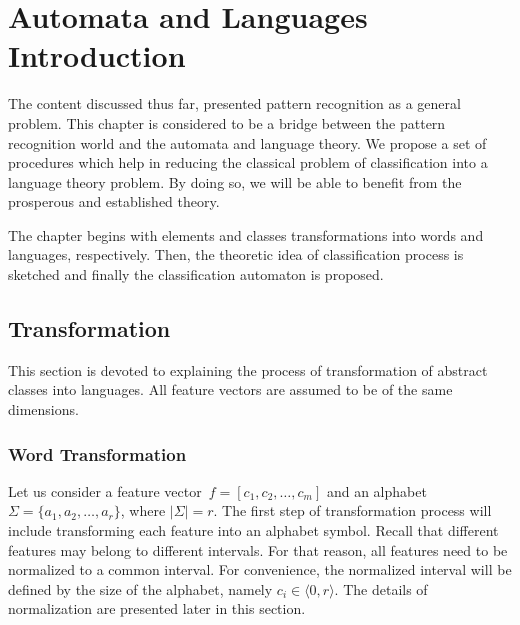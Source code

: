 \documentclass{mini}
\begin{document}
\chapter{Automata and Languages Introduction} \label{chap:lan_theory}

The content discussed thus far, presented pattern recognition as a general problem. This chapter is considered to be a bridge between the pattern recognition world and the automata and language theory. We propose a set of procedures which help in reducing the classical problem of classification into a language theory problem. By doing so, we will be able to benefit from the prosperous and established theory.

The chapter begins with elements and classes transformations into words and languages, respectively. Then, the theoretic idea of classification process is sketched and finally the classification automaton is proposed.

\section{Transformation}\label{sec:lan_theory_transf}
This section is devoted to explaining the process of transformation of abstract classes into languages. All feature vectors are assumed to be of the same dimensions.

\subsection{Word Transformation}\label{sec:lan_theory_transf_word}

Let us consider a feature vector~$f = [c_{1},c_{2},\ldots,c_{m}]$ and an alphabet $\Sigma=\{a_{1}, a_{2}, \ldots, a_{r} \}$, where $|\Sigma|=r$.
The first step of transformation process will include transforming each feature into an alphabet symbol. Recall that different features may belong to different intervals. For that reason, all features need to be normalized to a common interval. For convenience, the normalized interval will be defined by the size of the alphabet, namely $c_{i} \in \langle 0 , r \rangle$. The details of normalization are presented later in this section.
\end{document}
